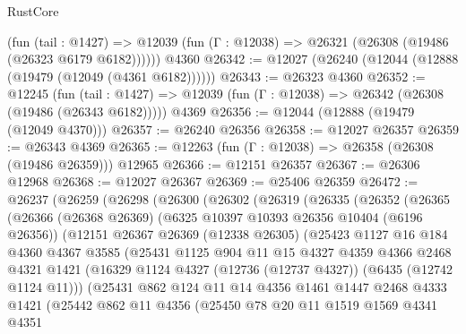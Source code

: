 \begin{lexlean}{RustCore}
\begin{coremodule}
      (fun (tail : @1427) =>
      @12039 (fun (Γ : @12038) => @26321 (@26308 (@19486 (@26323 @6179 @6182))))))
    @4360
@26342 := @12027 (@26240 (@12044 (@12888 (@19479 (@12049 (@4361 @6182))))))
@26343 := @26323 @4360
@26352 := @12245
    (fun (tail : @1427) => @12039 (fun (Γ : @12038) => @26342 (@26308 (@19486 (@26343 @6182)))))
    @4369
@26356 := @12044 (@12888 (@19479 (@12049 @4370)))
@26357 := @26240 @26356
@26358 := @12027 @26357
@26359 := @26343 @4369
@26365 := @12263 (fun (Γ : @12038) => @26358 (@26308 (@19486 @26359))) @12965
@26366 := @12151 @26357
@26367 := @26306 @12968
@26368 := @12027 @26367
@26369 := @25406 @26359
@26472 := @26237
    (@26259
      (@26298
        (@26300
          (@26302
            (@26319
              (@26335
                (@26352
                  (@26365
                    (@26366
                      (@26368 @26369)
                      (@6325 @10397 @10393 @26356 @10404 (@6196 @26356))
                      (@12151
                        @26367
                        @26369
                        (@12338 @26305)
                        (@25423
                          @1127
                          @16
                          @184
                          @4360
                          @4367
                          @3585
                          (@25431
                            @1125
                            @904
                            @11
                            @15
                            @4327
                            @4359
                            @4366
                            @2468
                            @4321
                            @1421
                            (@16329 @1124 @4327 (@12736 (@12737 @4327)) (@6435 (@12742 @1124 @11)))
                            (@25431
                              @862
                              @124
                              @11
                              @14
                              @4356
                              @1461
                              @1447
                              @2468
                              @4333
                              @1421
                              (@25442
                                @862
                                @11
                                @4356
                                (@25450
                                  @78
                                  @20
                                  @11
                                  @1519
                                  @1569
                                  @4341
                                  @4351

\end{coremodule}
\end{lexlean}
